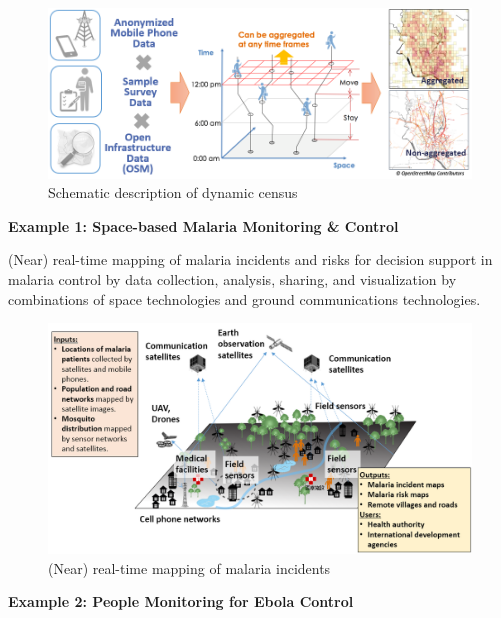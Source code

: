 \begin{figure}[H]
\begin{center}
\includegraphics[width = 0.8\linewidth]{Figures/dynamic_census.png}
\end{center}
\caption{Schematic description of dynamic census}
\label{dynamic_census}
\end{figure}

{\flushleft \bfseries Example 1: Space-based Malaria Monitoring \& Control}

(Near) real-time mapping of malaria incidents and risks for decision support in malaria control by data collection, analysis, sharing, and visualization by combinations of space technologies and ground communications technologies. 

\begin{figure}[H]
\begin{center}
\includegraphics[width = 0.8\linewidth]{Figures/malaria.png}
\end{center}
\caption{(Near) real-time mapping of malaria incidents}
\label{malaria}
\end{figure}

{\flushleft \bfseries Example 2: People Monitoring for Ebola Control}

